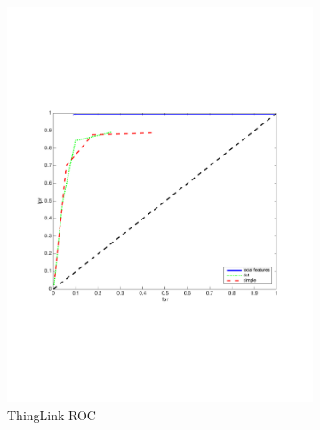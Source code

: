 \documentclass[english,12pt,a4paper,pdftex,elec,utf8, table]{aaltothesis}
\begin{document}
\begin{figure}[htb]
\begin{center}
\begin{subfigure}[b]{0.49\textwidth}
    \includegraphics[width=\textwidth]{figures/thinglink_Shave10pxROC.pdf}
    \caption{ThingLink ROC}
    \label{Shavepr}
  \end{subfigure}
  \begin{subfigure}[b]{0.49\textwidth}

\end{subfigure}
\end{center}
\end{figure}
\end{document}
